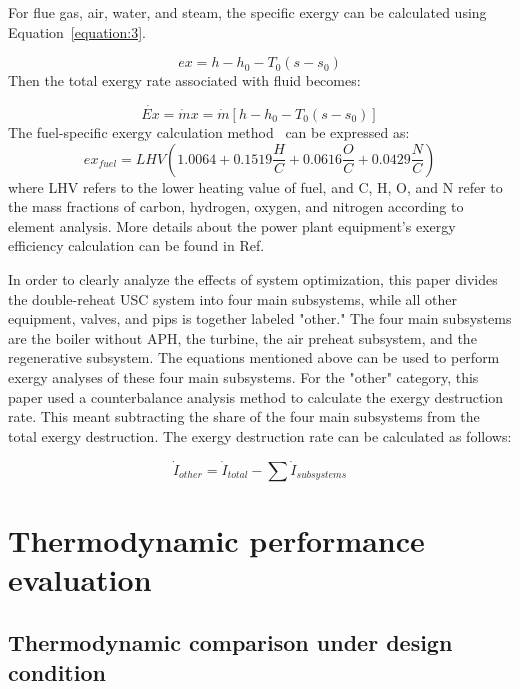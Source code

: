 \documentclass[preprint,12pt]{elsarticle}
\begin{document}
For flue gas, air, water, and steam, the specific exergy can be calculated using Equation~\ref{equation:3}.

\begin{equation}{}
\label{equation:3}
ex=h-h_{0}-T_{0}\left(s-s_{0}\right)
\end{equation}
Then the total exergy rate associated with ﬂuid becomes:

\begin{equation}
\dot{Ex}=\dot{m}x=\dot{m}\left[h-h_{0}-T_{0}\left(s-s_{0}\right)\right]{}
\end{equation}
The fuel-specific exergy calculation method~\cite{Yan2016The} can be expressed as:
\begin{equation}
ex_{fuel}=LHV\left(1.0064+0.1519\frac{H}{C}+0.0616\frac{O}{C}+0.0429\frac{N}{C}\right)
\end{equation}
where LHV refers to the lower heating value of fuel, and C, H, O, and N refer to the mass fractions of carbon, hydrogen, oxygen, and nitrogen according to element analysis.
More details about the power plant equipment's exergy efficiency calculation can be found in Ref.~\cite{G2016Exergy}

In order to clearly analyze the effects of system optimization, this paper divides the double-reheat USC system into four main subsystems, while all other equipment, valves, and pips is together labeled "other."
The four main subsystems are the boiler without APH, the turbine, the air preheat subsystem, and the regenerative subsystem.
The equations mentioned above can be used to perform exergy analyses of these four main subsystems.
For the "other" category, this paper used a counterbalance analysis method to calculate the exergy destruction rate. This meant subtracting the share of the four main subsystems from the total exergy destruction.
The exergy destruction rate can be calculated as follows:

\begin{equation}
\dot{I}_{other}=\dot{I}{}_{total}-\sum\dot{I}{}_{subsystems}
\end{equation}


\section{Thermodynamic performance evaluation} %
\label{sub:Thermodynamic_evaluation}

\subsection{Thermodynamic comparison under design condition}
\label{ssub:desing_compare}
\end{document}
